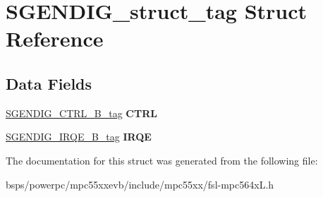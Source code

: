 \hypertarget{structSGENDIG__struct__tag}{}\section{S\+G\+E\+N\+D\+I\+G\+\_\+struct\+\_\+tag Struct Reference}
\label{structSGENDIG__struct__tag}
\subsection*{Data Fields}
\begin{DoxyCompactItemize}
\item 
\mbox{\label{structSGENDIG__struct__tag_a679c069706b45bd755c652d1ab98bb6e}} 
\mbox{\hyperlink{unionSGENDIG__CTRL__32B__tag}{S\+G\+E\+N\+D\+I\+G\+\_\+\+C\+T\+R\+L\+\_\+B\+\_\+tag}} {\bfseries C\+T\+RL}
\item 
\mbox{\label{structSGENDIG__struct__tag_a7a0ed5aa83a8f4824168ff30156d320f}} 
\mbox{\hyperlink{unionSGENDIG__IRQE__32B__tag}{S\+G\+E\+N\+D\+I\+G\+\_\+\+I\+R\+Q\+E\+\_\+B\+\_\+tag}} {\bfseries I\+R\+QE}
\end{DoxyCompactItemize}


The documentation for this struct was generated from the following file\+:\begin{DoxyCompactItemize}
\item 
bsps/powerpc/mpc55xxevb/include/mpc55xx/fsl-\/mpc564x\+L.\+h\end{DoxyCompactItemize}

